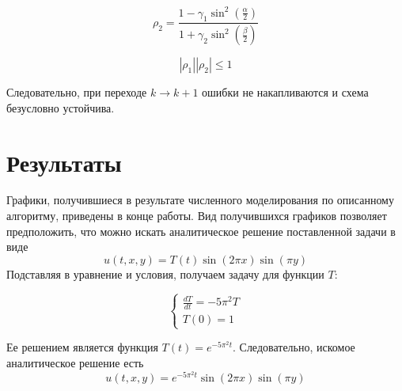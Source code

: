 \documentclass[12pt]{article}
\begin{document}
		$$\rho_2 = \frac{1 - \gamma_1 \sin^2 \left( \frac{\alpha}{2} \right)}{1 + \gamma_2 \sin^2 \left( \frac{\beta}{2} \right)}$$
		
		$$|\rho_1||\rho_2| \le 1$$
		
		Следовательно, при переходе $k \rightarrow k+1$ ошибки не накапливаются и схема безусловно устойчива.
	\section{Результаты}
		Графики, получившиеся в результате численного моделирования по описанному алгоритму, приведены в конце работы.
		Вид получившихся графиков позволяет предположить, что можно искать аналитическое решение поставленной задачи в виде
		$$u(t,x,y) = T(t)\sin(2 \pi x) \sin(\pi y)$$
		Подставляя в уравнение и условия, получаем задачу для функции $T$:
		
		\begin{equation}
			\begin{cases}
				\frac{dT}{dt} = -5 \pi^2 T \\
				T(0) = 1
			\end{cases}
		\end{equation}
		
		Ее решением является функция $T(t) = e^{-5\pi^2t}$. Следовательно, искомое аналитическое решение есть
		$$u(t,x,y) = e^{-5\pi^2 t}\sin(2\pi x) \sin(\pi y)$$
		
\end{document}
